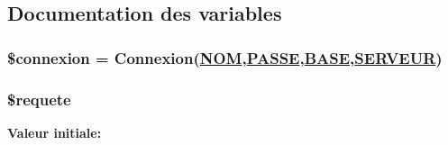 \subsection{Documentation des variables}
\hypertarget{organisme__enregistre_8php_a0}{
\subsubsection[\$connexion]{\setlength{\rightskip}{0pt plus 5cm}\$connexion = Connexion(\hyperlink{pma__connect_8php_a0}{NOM},\hyperlink{pma__connect_8php_a1}{PASSE},\hyperlink{pma__connect_8php_a3}{BASE},\hyperlink{pma__connect_8php_a2}{SERVEUR})}}
\label{organisme__enregistre_8php_a0}


\hypertarget{organisme__enregistre_8php_a1}{
\subsubsection[\$requete]{\setlength{\rightskip}{0pt plus 5cm}\$requete}}
\label{organisme__enregistre_8php_a1}


{\bf Valeur initiale:}

